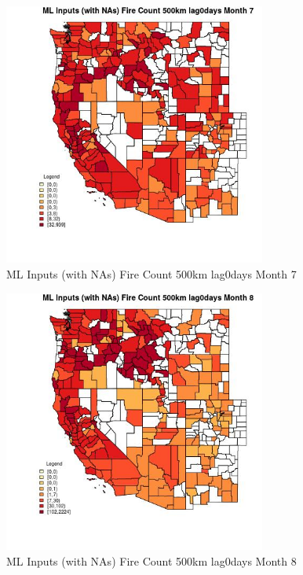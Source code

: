 \begin{figure} 
\centering  
\includegraphics[width=0.77\textwidth]{Code_Outputs/Report_ML_input_PM25_Step4_part_e_de_duplicated_aves_compiled_2019-05-20wNAs_CountyFire_Count_500km_lag0daysmedianMonth7.jpg} 
\caption{\label{fig:Report_ML_input_PM25_Step4_part_e_de_duplicated_aves_compiled_2019-05-20wNAsCountyFire_Count_500km_lag0daysmedianMonth7}ML Inputs (with NAs) Fire Count 500km lag0days Month 7} 
\end{figure} 
 

\begin{figure} 
\centering  
\includegraphics[width=0.77\textwidth]{Code_Outputs/Report_ML_input_PM25_Step4_part_e_de_duplicated_aves_compiled_2019-05-20wNAs_CountyFire_Count_500km_lag0daysmedianMonth8.jpg} 
\caption{\label{fig:Report_ML_input_PM25_Step4_part_e_de_duplicated_aves_compiled_2019-05-20wNAsCountyFire_Count_500km_lag0daysmedianMonth8}ML Inputs (with NAs) Fire Count 500km lag0days Month 8} 
\end{figure} 
 


